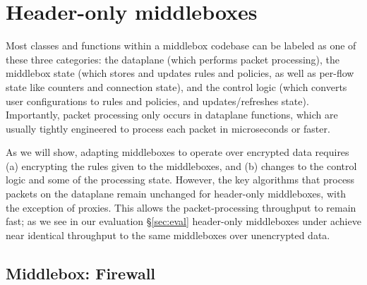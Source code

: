 \section{Header-only middleboxes}
\label{sec:homiddleboxes}
Most classes and functions within a middlebox codebase can be labeled as one of these three categories: the dataplane (which performs packet processing), the middlebox state (which stores and updates rules and policies, as well as per-flow state like counters and connection state), and the control logic (which converts user configurations to rules and policies, and updates/refreshes state). 
Importantly, packet processing only occurs in dataplane functions, which are usually tightly engineered to process each packet in microseconds or faster.

As we will show, adapting middleboxes to operate over encrypted data requires (a) encrypting the rules given to the middleboxes, and (b) changes to the control logic and some of the processing state. 
However, the key algorithms that process packets on the dataplane remain unchanged for header-only middleboxes, with the exception of proxies.
This allows the packet-processing throughput to remain fast; as we see in our evaluation \S\ref{sec:eval} header-only middleboxes under \sys achieve near identical throughput to the same middleboxes over unencrypted data. 

\subsection{Middlebox: Firewall}\label{sec:firewall}

